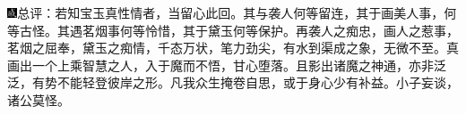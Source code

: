 {\includegraphics[width=3mm]{../Images/00005}总评：若知宝玉真性情者，当留心此回。其与袭人何等留连，其于画美人事，何等古怪。其遇茗烟事何等怜惜，其于黛玉何等保护。再袭人之痴忠，画人之惹事，茗烟之屈奉，黛玉之痴情，千态万状，笔力劲尖，有水到渠成之象，无微不至。真画出一个上乘智慧之人，入于魔而不悟，甘心堕落。且影出诸魔之神通，亦非泛泛，有势不能轻登彼岸之形。凡我众生掩卷自思，或于身心少有补益。小子妄谈，诸公莫怪。}

%
%
%
%
%
